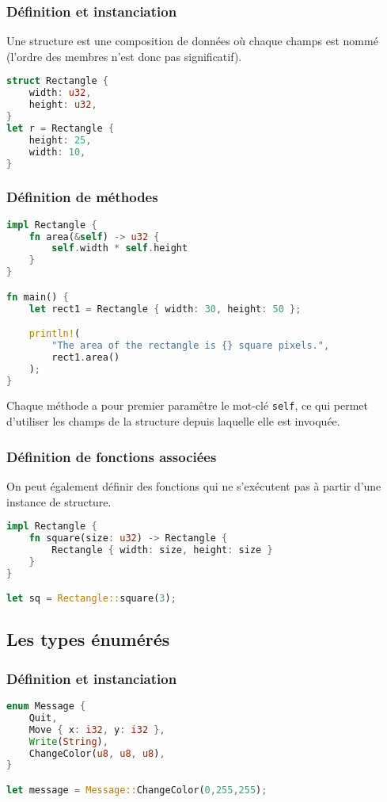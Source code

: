 \begin{frame}[fragile]
  \frametitle{Définition et instanciation}
Une structure est une composition de données où chaque champs est nommé (l'ordre des membres n'est donc pas significatif).
  \begin{lstlisting}[language=rust]
struct Rectangle {
    width: u32,
    height: u32,
}
let r = Rectangle {
    height: 25,
    width: 10,
}
  \end{lstlisting}
\end{frame}

\begin{frame}[fragile]
  \frametitle{Définition de méthodes}
\begin{lstlisting}[language=rust, basicstyle=\tiny{}]
impl Rectangle {
    fn area(&self) -> u32 {
        self.width * self.height
    }
}

fn main() {
    let rect1 = Rectangle { width: 30, height: 50 };

    println!(
        "The area of the rectangle is {} square pixels.",
        rect1.area()
    );
}
\end{lstlisting}
Chaque méthode a pour premier paramêtre le mot-clé \texttt{self}, ce qui permet d'utiliser les champs de la structure depuis laquelle elle est invoquée.
\end{frame}

\begin{frame}[fragile]
  \frametitle{Définition de fonctions associées}
On peut également définir des fonctions qui ne s'exécutent pas à partir d'une instance de structure.
\begin{lstlisting}[language=rust]
impl Rectangle {
    fn square(size: u32) -> Rectangle {
        Rectangle { width: size, height: size }
    }
}

let sq = Rectangle::square(3);
\end{lstlisting}  
\end{frame}

\subsection{Les types énumérés}

\begin{frame}[fragile]
  \frametitle{Définition et instanciation}
  \begin{lstlisting}[language=rust]
enum Message {
    Quit,
    Move { x: i32, y: i32 },
    Write(String),
    ChangeColor(u8, u8, u8),
}

let message = Message::ChangeColor(0,255,255);
  \end{lstlisting}
\end{frame}

